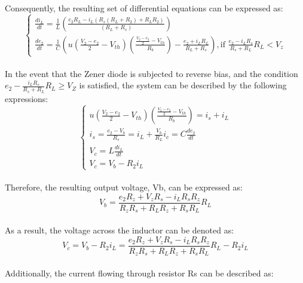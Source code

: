 Consequently, the resulting set of differential equations can be expressed as:\\

\begin{equation}
    \begin{cases}
        \frac{di_L}{dt}=\frac{1}{L}(\frac{e_2R_L-i_L(R_s(R_L+R_2)+R_LR_2)}{(R_L+R_s)})\\
        \frac{de_2}{dt}=\frac{1}{C}(u(\frac{V_2-e_2}{2}-V_{th})(\frac{\frac{V_2-e_2}{2}-V_{th}}{R_b})-\frac{e_2+i_LR_L}{R_L+R_s}),  \text{if } \frac{e_2-i_LR_s}{R_s+R_L}R_L<V_z
    \end{cases}
\end{equation}\\

In the event that the Zener diode is subjected to reverse bias, and the condition $e_2 - \frac{i_L R_s}{R_s+R_L} R_L \geq V_Z$ is satisfied, the system can be described by the following expressions:\\

\begin{equation}
    \begin{cases}
        u(\frac{V_2-e_2}{2}-V_{th})(\frac{\frac{V_2-e_2}{2}-V_{th}}{R_b})=i_s+i_L\\
        i_s=\frac{e_2-V_b}{R_s}=i_L+\frac{V_b}{R_L}
        i_c=C\frac{de_2}{dt}\\
        V_c=L\frac{di_L}{dt}\\
        V_c=V_b-R_2i_L
    \end{cases}
\end{equation}\\

Therefore, the resulting output voltage, Vb, can be expressed as:\\

\begin{equation}
    V_b=\frac{e_2R_z+V_zR_s-i_LR_sR_z}{R_zR_s+R_LR_z+R_sR_L}R_L
\end{equation}\\

As a result, the voltage across the inductor can be denoted as:\\

\begin{equation}
    V_c=V_b-R_2i_L=\frac{e_2R_z+V_zR_s-i_LR_sR_z}{R_zR_s+R_LR_z+R_sR_L}R_L-R_2i_L
\end{equation}\\

Additionally, the current flowing through resistor Rs can be described as:\\

